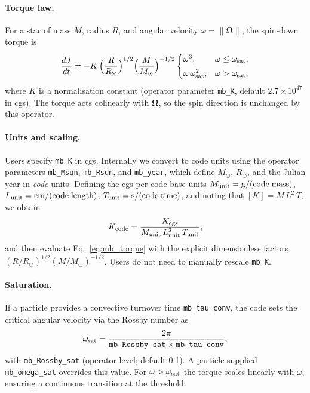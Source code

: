 \documentclass[11pt]{article}
\begin{document}
\paragraph{Torque law.}
For a star of mass $M$, radius $R$, and angular velocity
$\omega = \lVert\boldsymbol{\Omega}\rVert$, the spin‑down torque is
\begin{equation}
\label{eq:mb_torque}
\frac{dJ}{dt}
= -K\,\Big(\frac{R}{R_\odot}\Big)^{1/2}\Big(\frac{M}{M_\odot}\Big)^{-1/2}
\begin{cases}
\omega^3, & \omega \le \omega_{\rm sat},\\[3pt]
\omega\,\omega_{\rm sat}^{2}, & \omega > \omega_{\rm sat},
\end{cases}
\end{equation}
where $K$ is a normalisation constant (operator parameter \texttt{mb\_K},
default $2.7\times10^{47}$ in cgs). The torque acts colinearly with
$\boldsymbol{\Omega}$, so the spin direction is unchanged by this operator.

\paragraph{Units and scaling.}
Users specify \texttt{mb\_K} in cgs. Internally we convert to code units using
the operator parameters \texttt{mb\_Msun}, \texttt{mb\_Rsun}, and
\texttt{mb\_year}, which define $M_\odot$, $R_\odot$, and the Julian year in
\emph{code} units. Defining the cgs-per-code base units
$M_{\rm unit}=\mathrm{g}/\mathrm{(code\;mass)}$,
$L_{\rm unit}=\mathrm{cm}/\mathrm{(code\;length)}$,
$T_{\rm unit}=\mathrm{s}/\mathrm{(code\;time)}$, and noting that
$[K]=M\,L^{2}\,T$, we obtain
\begin{equation}
K_{\rm code}=\frac{K_{\rm cgs}}{M_{\rm unit}\,L_{\rm unit}^{2}\,T_{\rm unit}},
\end{equation}
and then evaluate Eq.~\eqref{eq:mb_torque} with the explicit
dimensionless factors $(R/R_\odot)^{1/2}(M/M_\odot)^{-1/2}$.
Users do not need to manually rescale \texttt{mb\_K}.

\paragraph{Saturation.}
If a particle provides a convective turnover time \texttt{mb\_tau\_conv},
the code sets the critical angular velocity via the Rossby number as
\begin{equation}
\omega_{\rm sat} = \frac{2\pi}{\texttt{mb\_Rossby\_sat}\times \texttt{mb\_tau\_conv}},
\end{equation}
with \texttt{mb\_Rossby\_sat} (operator level; default 0.1).
A particle-supplied \texttt{mb\_omega\_sat} overrides this value.
For $\omega>\omega_{\rm sat}$ the torque scales linearly with $\omega$,
ensuring a continuous transition at the threshold.
\end{document}
